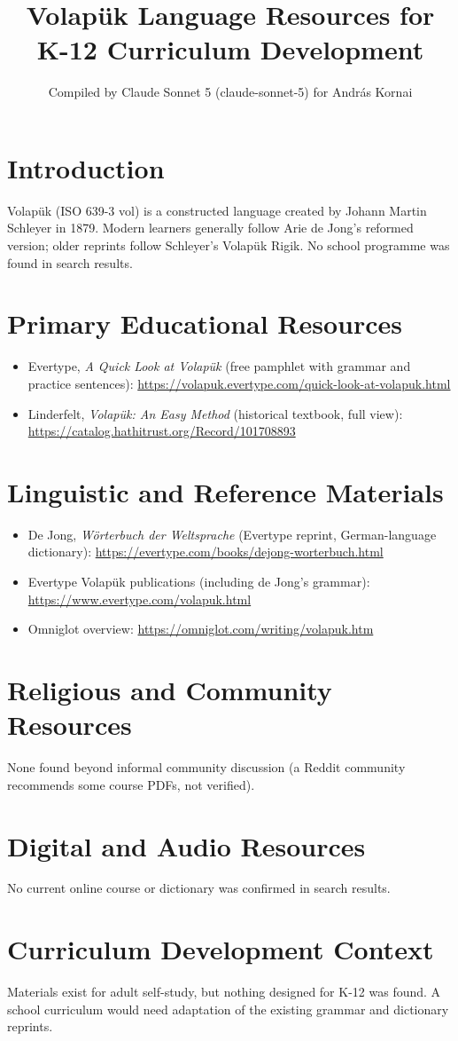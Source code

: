 \documentclass[12pt]{article}
\title{Volap\"uk Language Resources for K-12 Curriculum Development}
\author{Compiled by Claude Sonnet 5 (claude-sonnet-5) for Andr\'as Kornai}
\date{}
\begin{document}
\maketitle

\section{Introduction}
Volap\"uk (ISO 639-3 vol) is a constructed language created by Johann Martin Schleyer in 1879. Modern learners generally follow Arie de Jong's reformed version; older reprints follow Schleyer's Volap\"uk Rigik. No school programme was found in search results.

\section{Primary Educational Resources}
\begin{itemize}
\item Evertype, \emph{A Quick Look at Volap\"uk} (free pamphlet with grammar and practice sentences): \url{https://volapuk.evertype.com/quick-look-at-volapuk.html}
\item Linderfelt, \emph{Volap\"uk: An Easy Method} (historical textbook, full view): \url{https://catalog.hathitrust.org/Record/101708893}
\end{itemize}

\section{Linguistic and Reference Materials}
\begin{itemize}
\item De Jong, \emph{W\"orterbuch der Weltsprache} (Evertype reprint, German-language dictionary): \url{https://evertype.com/books/dejong-worterbuch.html}
\item Evertype Volap\"uk publications (including de Jong's grammar): \url{https://www.evertype.com/volapuk.html}
\item Omniglot overview: \url{https://omniglot.com/writing/volapuk.htm}
\end{itemize}

\section{Religious and Community Resources}
None found beyond informal community discussion (a Reddit community recommends some course PDFs, not verified).

\section{Digital and Audio Resources}
No current online course or dictionary was confirmed in search results.

\section{Curriculum Development Context}
Materials exist for adult self-study, but nothing designed for K-12 was found. A school curriculum would need adaptation of the existing grammar and dictionary reprints.
\end{document}
